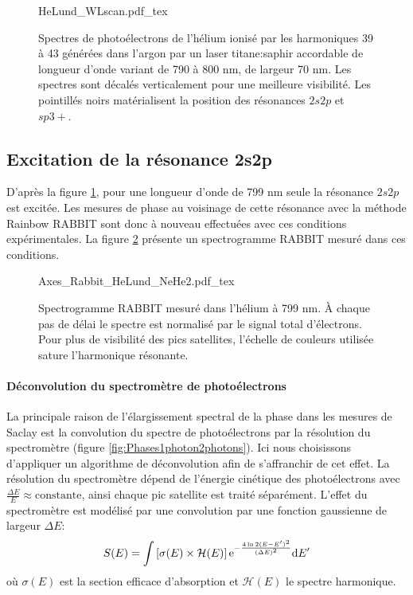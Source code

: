 \begin{figure} [ht]
\centering
\def\svgwidth{\textwidth}
{HeLund_WLscan.pdf_tex}
\caption{Spectres de photoélectrons de l'hélium ionisé par les harmoniques 39 à 43 générées dans l'argon par un laser titane:saphir accordable de longueur d'onde variant de 790 à 800 nm, de largeur 70 nm. Les spectres sont décalés verticalement pour une meilleure visibilité. Les pointillés noirs matérialisent la position des résonances $2s2p$ et $sp3+$.}
\label{fig:HeLund_WLscan}
\end{figure}

\subsection{Excitation de la résonance 2s2p}
D'après la figure \ref{fig:HeLund_WLscan}, pour une longueur d'onde de 799 nm seule la résonance $2s2p$ est excitée. Les mesures de phase au voisinage de cette résonance avec la méthode Rainbow RABBIT sont donc à nouveau effectuées avec ces conditions expérimentales. La figure \ref{fig:Rabbit_HeLund_2s2p} présente un spectrogramme RABBIT mesuré dans ces conditions.

\begin{figure} [!ht]
\centering
\def\svgwidth{0.7\textwidth}
{Axes_Rabbit_HeLund_NeHe2.pdf_tex}
\caption{Spectrogramme RABBIT mesuré dans l'hélium à 799 nm. \`{A} chaque pas de délai le spectre est normalisé par le signal total d'électrons. Pour plus de visibilité des pics satellites, l'échelle de couleurs utilisée sature l'harmonique résonante.}
\label{fig:Rabbit_HeLund_2s2p}
\end{figure}

\paragraph*{Déconvolution du spectromètre de photoélectrons} La principale raison de l'élargissement spectral de la phase dans les mesures de Saclay est la convolution du spectre de photoélectrons par la résolution du spectromètre (figure \ref{fig:Phases1photon2photons}). Ici nous choisissons d'appliquer un algorithme de déconvolution afin de s'affranchir de cet effet. La résolution du spectromètre dépend de l'énergie cinétique des photoélectrons avec $\frac{\Delta E}{E} \approx \text{constante}$, ainsi chaque pic satellite est traité séparément. L'effet du spectromètre est modélisé par une convolution par une fonction gaussienne de largeur $\Delta E$:
\begin{equation}
S(E) = \int \left[ \sigma(E) \times \mathcal{H} (E) \right] \mathrm{e}^{-\frac{4 \ln 2 (E-E')^2}{(\Delta E)^2}} \mathrm{d} E'
\end{equation}
où $\sigma(E)$ est la section efficace d'absorption et $\mathcal{H}(E)$ le spectre harmonique.

